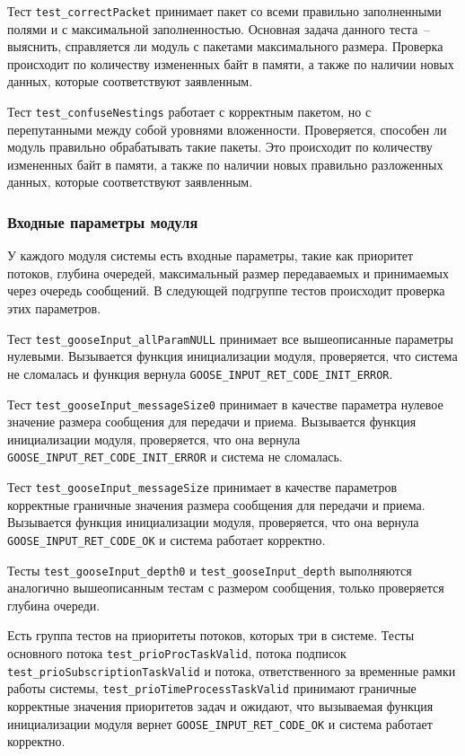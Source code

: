 Тест \lstinline{test_correctPacket} принимает пакет со всеми правильно заполненными полями и с максимальной заполненностью. Основная задача данного теста~-- выяснить, справляется ли модуль с пакетами максимального размера. Проверка происходит по количеству измененных байт в памяти, а также по наличии новых данных, которые соответствуют заявленным.

Тест \lstinline{test_confuseNestings} работает с корректным пакетом, но с перепутанными между собой уровнями вложенности. Проверяется, способен ли модуль правильно обрабатывать такие пакеты. Это происходит по количеству измененных байт в памяти, а также по наличии новых правильно разложенных данных, которые соответствуют заявленным.

\subsubsection{Входные параметры модуля}

У каждого модуля системы есть входные параметры, такие как приоритет потоков, глубина очередей, максимальный размер передаваемых и принимаемых через очередь сообщений. В следующей подгруппе тестов происходит проверка этих параметров.

Тест \lstinline{test_gooseInput_allParamNULL} принимает все вышеописанные параметры нулевыми. Вызывается функция инициализации модуля, проверяется, что система не сломалась и функция вернула \lstinline{GOOSE_INPUT_RET_CODE_INIT_ERROR}.

Тест \lstinline{test_gooseInput_messageSize0} принимает в качестве параметра нулевое значение размера сообщения для передачи и приема. Вызывается функция инициализации модуля, проверяется, что она вернула \lstinline{GOOSE_INPUT_RET_CODE_INIT_ERROR} и система не сломалась.

Тест \lstinline{test_gooseInput_messageSize} принимает в качестве параметров корректные граничные значения размера сообщения для передачи и приема. Вызывается функция инициализации модуля, проверяется, что она вернула \lstinline{GOOSE_INPUT_RET_CODE_OK} и система работает корректно.

Тесты \lstinline{test_gooseInput_depth0} и \lstinline{test_gooseInput_depth} выполняются аналогично вышеописанным тестам с размером сообщения, только проверяется глубина очереди.

Есть группа тестов на приоритеты потоков, которых три в системе. Тесты основного потока \lstinline{test_prioProcTaskValid}, потока подписок \lstinline{test_prioSubscriptionTaskValid} и потока, ответственного за временные рамки работы системы, \lstinline{test_prioTimeProcessTaskValid} принимают граничные корректные значения приоритетов задач и ожидают, что вызываемая функция инициализации модуля вернет \lstinline{GOOSE_INPUT_RET_CODE_OK} и система работает корректно.

